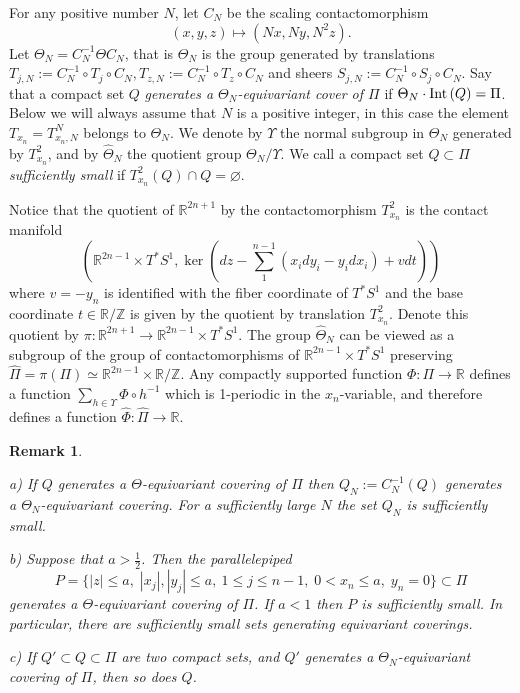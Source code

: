 \documentclass[12pt]{paper}
\theoremstyle{plain}
\newtheorem{remark}[theorem]{Remark}
\theoremstyle{definition}
\newcommand{\wh}{\widehat}
\newcommand{\Z}{{\mathbb{Z}}}
\newcommand{\R}{{\mathbb{R}}}
\newcommand{\Int}{{\rm Int\,}} %
\numberwithin{figure}{section}
\begin{document}
For any positive number $N$, let $C_N$ be the scaling contactomorphism
 $$(x,y,z)\mapsto (Nx,Ny,N^2z).$$ 
 Let $\Theta_N = C^{-1}_N\Theta C_N$, that is $\Theta_N$ is the group generated by translations $T_{j,N}:=C_N^{-1}\circ T_j\circ C_N, T_{z,N}:=C_N^{-1}\circ T_z\circ C_N$ and sheers
 $S_{j,N}:=C_N^{-1}\circ S_j\circ C_N$. Say that a compact set $Q$ \emph{generates a $\Theta_N$-equivariant cover of $\Pi$} if $\Theta_N \cdot \Int(Q) = \Pi$.  Below we will always assume that $N$ is a positive integer, in this case the element $T_{x_n} = T_{x_n, N}^N$ belongs to $\Theta_N$. We denote  by $\Upsilon$ the normal subgroup in $\Theta_N$ generated by $T_{x_n}^2$, and by $\wh\Theta_N$ the quotient group $\Theta_N/\Upsilon$.
 We call a compact set $Q\subset\Pi$ {\em sufficiently small} if $T_{x_n}^2(Q)\cap Q=\varnothing$.
 
Notice that the quotient of $\R^{2n+1}$ by the contactomorphism $T^2_{x_n}$ is the contact manifold 
$$\left(\R^{2n-1} \times T^*S^1, \ker(dz-\sum\limits_1^{n-1}(x_idy_i-y_idx_i)+vdt)\right)$$
where $v = -y_n$ is identified with the fiber coordinate of $T^*S^1$ and the base coordinate $t \in \R/\Z$ is given by the quotient by translation  $T^2_{x_n}$. Denote this quotient by $\pi:\R^{2n+1} \to \R^{2n-1} \times T^*S^1$.  The group $\wh\Theta_N$ can be viewed as a subgroup of the group of contactomorphisms of $\R^{2n-1} \times T^*S^1$ preserving
$\wh \Pi=\pi(\Pi)\simeq\R^{2n-1}\times \R/\Z$.
Any compactly supported function $\Phi :\Pi \to \R$ defines a function $\sum\limits_{h \in \Upsilon} \Phi \circ h^{-1}$ which is 1-periodic in the $x_n$-variable, and therefore defines a function $\wh\Phi: \wh\Pi \to \R$.  


 \begin{remark}\label{rm:generator}{\rm
 \begin{description}
 \item{a)} If  $Q$  generates a  $\Theta$-equivariant covering of $\Pi$   then $Q_N:=C_N^{-1}(Q)$ generates a  $\Theta_N$-equivariant covering. For a sufficiently large $N$ the set $Q_N$ is sufficiently small.
 \item{b)} Suppose that $a>\frac12$. Then the parallelepiped $$P=\{|z|\leq a, \;|x_j|, |y_j|\leq a,\ 1\leq j\leq  n-1,\; 0<x_n\leq a,\;  y_n=0\}\subset\Pi$$ generates  a  
 $\Theta$-equivariant covering of $\Pi$. If $a<1$ then $P$ is sufficiently small. In particular, there are sufficiently small sets generating equivariant coverings.
 \item{c)} If $Q'\subset Q\subset \Pi$ are two compact sets, and $Q'$  generates a  $\Theta_N$-equivariant covering of $\Pi$, then so does $Q$. 
   \end{description}
 }
  \end{remark}
  
\end{document}
